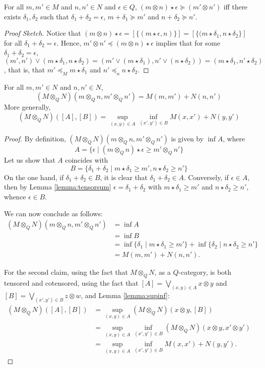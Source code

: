 \begin{lemma}\label{lemma:tensorsum}
For all $m,m'\in M$ and $n,n'\in N$ and $\epsilon \in Q$, 
$(m\otimes n)\star \epsilon \succeq (m'\otimes n')$ iff there exists $\delta_{1},\delta_{2}$ such that $\delta_{1}+\delta_{2}=\epsilon$, 
$m+\delta_{1}\succeq m'$ and $n+\delta_{2}\succeq n'$.
\end{lemma}
\begin{proof}[Proof Sketch]
Notice that $(m\otimes n)\star \epsilon = [\{(m\star \epsilon,n)\}]=
[\{(m\star \delta_{1},n\star \delta_{2}\}]$ for all $\delta_{1}+\delta_{2}=\epsilon$. 
Hence, $m'\otimes n' \preceq (m\otimes n)\star \epsilon$ implies that 
for some $\delta_{1}+\delta_{2}=\epsilon$, 
$(m',n')\vee (m\star\delta_{1},n\star\delta_{2}) = (m'\vee (m\star\delta_{1}), n'\vee (n\star\delta_{2}))= (m\star \delta_{1}, n'\star\delta_{2})$, that is, that $m'\preceq_{M} m\star \delta_{1}$ and $n'\preceq_{n}n\star \delta_{2}$. 
\end{proof}


\begin{proposition}\label{prop:tensormetric}
For all $m,m'\in N$ and $n,n'\in N$, 
$$
(M\otimes_{Q} N)(m\otimes_{Q} n, m'\otimes_{Q}n')= M(m,m') +N(n,n')
$$
More generally, 
$$
(M\otimes_{Q}N)([A],[B])= \sup_{(x,y)\in A}\inf_{(x',y')\in B}M(x,x')+N(y,y')
$$
\end{proposition}
\begin{proof}
By definition, $(M\otimes_{Q} N)(m\otimes_{Q} n, m'\otimes_{Q}n')$ is given by $\inf A$, where
$$
A=\{ \epsilon \mid (m\otimes_{Q}n)\star\epsilon \geq m'\otimes_{Q}n'\}
$$
Let us show that $A$ coincides with 
$$
B=\{ \delta_{1}+\delta_{2} \mid m\star\delta_{1} \geq  m', n\star \delta_{2}\geq n'\}$$
On the one hand, if $\delta_{1}+\delta_{2}\in B$, it is clear that $\delta_{1}+\delta_{2}\in A$. Conversely, if $\epsilon\in A$, then by Lemma \ref{lemma:tensorsum} $\epsilon=\delta_{1}+\delta_{2}$ with $m\star\delta_{1}\geq m'$ and $n\star \delta_{2}\geq n'$, whence 
$\epsilon \in B$. 

We can now conclude as follows:
\begin{align*}
(M\otimes_{Q} N)(m\otimes_{Q} n, m'\otimes_{Q}n')& =\inf A \\
&= \inf B \\
&= \inf \{ \delta_{1} \mid m\star\delta_{1} \geq  m'\}
+ \inf\{ \delta_{2} \mid  n\star \delta_{2}\geq n'\}\\
&= M(m,m')+N(n,n').
\end{align*}


For the second claim, using the fact that $M\otimes_{Q}N$, as a $Q$-category, is both tensored and cotensored, using the fact that 
$[A]=\bigvee_{(x,y)\in A}x\otimes y$ and $[B]=\bigvee_{(x',y')\in B}z\otimes w$, and Lemma \ref{lemma:supinf}:
\begin{align*}
(M\otimes_{Q} N)([A],[B])&=
\sup_{(x,y)\in A}(M\otimes_{Q}N)(x\otimes y, [B]) \\
&=\sup_{(x,y)\in A}\inf_{(x',y')\in B}(M\otimes_{Q}N)(x\otimes y, x'\otimes y') 
\\
&=
\sup_{(x,y)\in A} \inf_{(x',y')\in B}M(x,x')+N(y,y').
\end{align*}
\end{proof}

